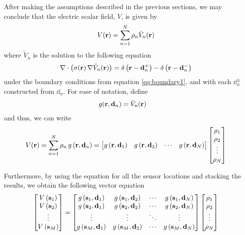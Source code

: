 %
After making the assumptions described in the previous sections, we may conclude that the electric scalar field, $V$, is given by
\begin{equation}
V(\mathbf{r}) = 
\sum_{n=1}^N \rho_n \tilde{V}_{n}(\mathbf{r})
\end{equation}
where $\tilde{V}_n$ is the solution to the following equation
\begin{equation}
\nabla \cdot\left( \sigma(\mathbf{r})\, \nabla \tilde{V}_n(\mathbf{r})  \right) = 
{\delta\left( \mathbf{r}-\mathbf{d}_n^+ \right) - \delta\left( \mathbf{r}-\mathbf{d}_n^- \right)}
\end{equation}
under the boundary conditions from equation \eqref{eq:boundary1}, and with each $\dd_n^\pm$ constructed from $\dd_n$.
%
For ease of notation, define 
\begin{align}
g(\mathbf{r}, \mathbf{d}_n) &= \tilde{V}_n(\mathbf{r})
\end{align}
and thus, we can write
\begin{equation}
V(\mathbf{r}) = 
\sum_{n=1}^N \rho_n\, g\left( \mathbf{r}, \mathbf{d}_n \right) = 
\begin{bmatrix}
    g\left( \mathbf{r}, \mathbf{d}_1 \right) & 
    g\left( \mathbf{r}, \mathbf{d}_2 \right) &
    \cdots &
    g\left( \mathbf{r}, \mathbf{d}_N \right)
\end{bmatrix}
\begin{bmatrix}
    \rho_1 \\ \rho_2 \\ \vdots \\ \rho_N
\end{bmatrix}
\label{eq:back1}
\end{equation}

Furthermore, by using the equation for all the sensor locations and stacking the results, we obtain the following vector equation
\begin{equation}
\begin{bmatrix}
V\left( \mathbf{s}_1 \right) \\
V\left( \mathbf{s}_2 \right) \\
\vdots \\
V\left( \mathbf{s}_M \right)
\end{bmatrix}
=
\begin{bmatrix}
    g\left( \mathbf{s}_1, \mathbf{d}_1 \right) & 
    g\left( \mathbf{s}_1, \mathbf{d}_2 \right) &
    \cdots &
    g\left( \mathbf{s}_1, \mathbf{d}_N \right) 
    \\
    g\left( \mathbf{s}_2, \mathbf{d}_1 \right) & 
    g\left( \mathbf{s}_2, \mathbf{d}_2 \right) &
    \cdots &
    g\left( \mathbf{s}_2, \mathbf{d}_N \right) 
    \\
    \vdots & \vdots & \ddots & \vdots
    \\
    g\left( \mathbf{s}_M, \mathbf{d}_1 \right) & 
    g\left( \mathbf{s}_M, \mathbf{d}_2 \right) &
    \cdots &
    g\left( \mathbf{s}_M, \mathbf{d}_N \right)
\end{bmatrix}
\begin{bmatrix}
    \rho_1 \\ \rho_2 \\ \vdots \\ \rho_N
\end{bmatrix}
\label{eq:model3}
\end{equation}

